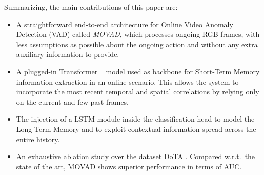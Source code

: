 Summarizing, the main contributions of this paper are:
\begin{itemize}%
    \item A straightforward end-to-end architecture for Online Video Anomaly Detection (VAD) called \emph{MOVAD}, which processes ongoing RGB frames, with less assumptions as possible about the ongoing action and without any extra auxiliary information to provide.
    \item A plugged-in Transformer ~\cite{liu_video_2022} model used as backbone for Short-Term Memory information extraction in an online scenario.
    This allows the system to incorporate the most recent temporal and spatial correlations by relying only on the current and few past frames.
    \item The injection of a LSTM module inside the classification head to model the Long-Term Memory and to exploit contextual information spread across the entire history.
    \item An exhaustive ablation study over the dataset DoTA \cite{9712446}.
    Compared w.r.t.~the state of the art, MOVAD shows superior performance in terms of AUC.
\end{itemize}